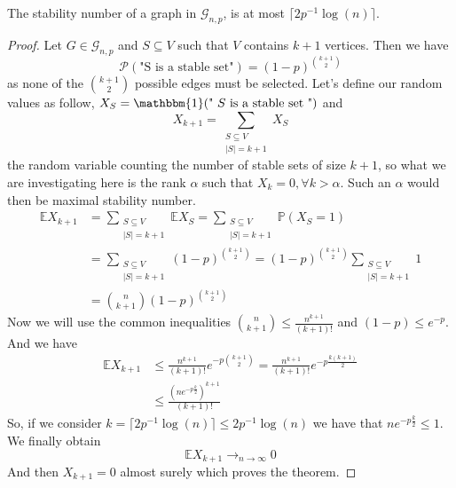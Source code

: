\begin{theorem}
	The stability number of a graph in $\mathcal{G}_{n, p}$, is at most $\lceil 2p^{-1}\log(n)\rceil$.
\end{theorem}
\begin{proof}
	Let $G \in \mathcal{G}_{n,p}$ and $S \subseteq V$ such that $V$ contains $k+1$ vertices.
	Then we have 
	\begin{equation}
		\mathcal{P}(\text{"S is a stable set"}) = (1-p)^{\binom{k+1}{2}  }
	\end{equation}
	as none of the $\binom{k+1}{2}$ possible edges must be selected.
	\newline
	Let's define our random values as follow, $X_S = \mathbbm{1}(\text{" $S$ is a stable set "})$ and
	\begin{equation}
		X_{k+1} = \sum_{\substack{ S \subseteq V \\ |S| = k + 1}} X_S
	\end{equation}
	the random variable counting the number of stable sets of size $k+1$, so what we are investigating here is the rank $\alpha$ such that $X_k = 0, \forall k > \alpha$. Such an $\alpha$ would then be maximal stability number.
	\begin{align}
		\mathbb{E}X_{k+1} &= \sum_{\substack{ S \subseteq V \\ |S| = k + 1}} \mathbb{E} X_S 	
				  = \sum_{\substack{ S \subseteq V \\ |S| = k + 1}} \mathbb{P}(X_S = 1)	\\		
		&= \sum_{\substack{ S \subseteq V \\ |S| = k + 1}} (1-p)^{\binom{k+1}{2}  }		
		= (1-p)^{\binom{k+1}{2}} \sum_{\substack{ S \subseteq V \\ |S| = k + 1}} 1 	\\	
		&= \binom{n}{k+1} (1-p)^{\binom{k+1}{2}} 
	\end{align}
	Now we will use the common inequalities $  \binom{n}{k+1} \leq \frac{n^{k+1}}{(k+1)!} $ and $(1-p) \leq e^{-p}$. 
	And we have
	\begin{align}
		\mathbb{E}X_{k+1} 	&\leq  \frac{n^{k+1}}{(k+1)!} e^{-p \binom{k+1}{2}} = \frac{n^{k+1}}{(k+1)!} e^{-p \frac{k(k+1)}{2}}\\
									     &\leq  \frac{(ne^{-p\frac{k}{2}})^{k+1}}{(k+1)!}
	\end{align}
	So, if we consider $k = \lceil 2p^{-1}\log(n)\rceil \leq 2p^{-1}\log(n)$ we have that $ ne^{-p\frac{k}{2}} \leq 1$.
	We finally obtain 
	\begin{equation}
		\mathbb{E} X_{k+1} \longrightarrow_{n \to \infty} 0
	\end{equation}
	And then $X_{k+1} = 0$ almost surely which proves the theorem.

\end{proof}

